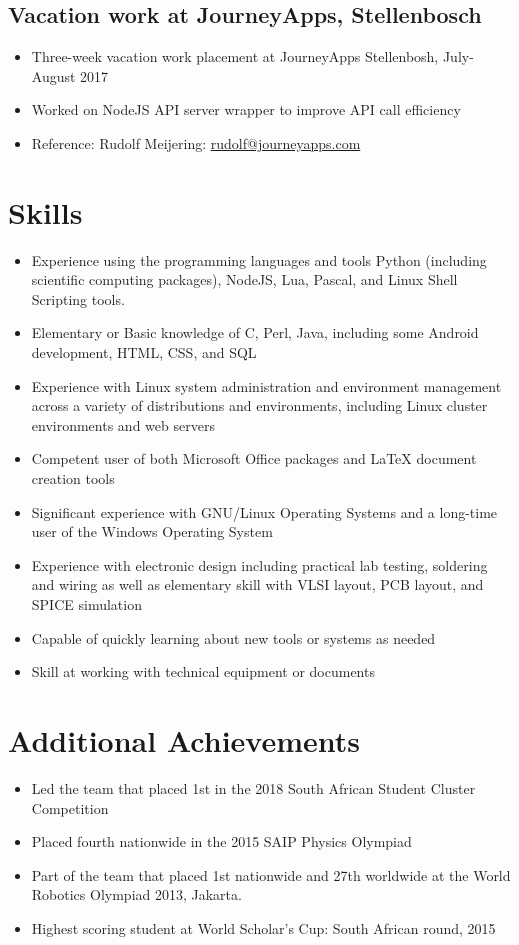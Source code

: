 \documentclass[10pt,a4paper,notitlepage]{article}
\begin{document}
\subsection*{Vacation work at JourneyApps, Stellenbosch}
\begin{itemize}
	\setlength\itemsep{0.02em}
    \item Three-week vacation work placement at JourneyApps Stellenbosh, July-August 2017
    \item Worked on NodeJS API server wrapper to improve API call efficiency
    \item Reference: Rudolf Meijering: \href{mailto:rudolf@journeyapps.com}{rudolf@journeyapps.com}
\end{itemize}

\section*{Skills}
\begin{itemize}
	\setlength\itemsep{0.02em}
    \item Experience using the programming languages and tools Python (including scientific computing packages), NodeJS, Lua, Pascal, and Linux Shell Scripting tools.
    \item Elementary or Basic knowledge of C, Perl, Java, including some Android development, HTML, CSS, and SQL
    \item Experience with Linux system administration and environment management across a variety of distributions and environments, including Linux cluster environments and web servers
    \item Competent user of both Microsoft Office packages and LaTeX document creation tools
    \item Significant experience with GNU/Linux Operating Systems and a long-time user of the Windows Operating System
    \item Experience with electronic design including practical lab testing, soldering and wiring as well as elementary skill with VLSI layout, PCB layout, and SPICE simulation
    \item Capable of quickly learning about new tools or systems as needed
    \item Skill at working with technical equipment or documents
\end{itemize}

\section*{Additional Achievements}
\begin{itemize}
	\setlength\itemsep{0.02em}
    \item Led the team that placed 1st in the 2018 South African Student Cluster Competition
    \item Placed fourth nationwide in the 2015 SAIP Physics Olympiad
    \item Part of the team that placed 1st nationwide and 27th worldwide at the World Robotics Olympiad 2013, Jakarta.
    \item Highest scoring student at World Scholar's Cup: South African round, 2015
\end{itemize}
\end{document}
